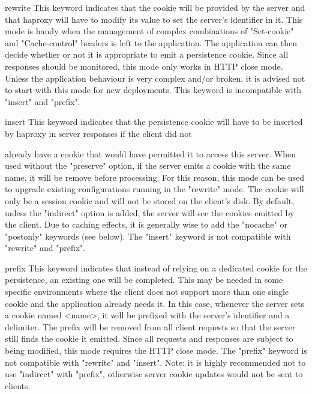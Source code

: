     rewrite   This keyword indicates that the cookie will be provided by the
              server and that haproxy will have to modify its value to set the
              server's identifier in it. This mode is handy when the management
              of complex combinations of "Set-cookie" and "Cache-control"
              headers is left to the application. The application can then
              decide whether or not it is appropriate to emit a persistence
              cookie. Since all responses should be monitored, this mode only
              works in HTTP close mode. Unless the application behaviour is
              very complex and/or broken, it is advised not to start with this
              mode for new deployments. This keyword is incompatible with
              "insert" and "prefix".

    insert    This keyword indicates that the persistence cookie will have to
              be inserted by haproxy in server responses if the client did not

              already have a cookie that would have permitted it to access this
              server. When used without the "preserve" option, if the server
              emits a cookie with the same name, it will be remove before
              processing.  For this reason, this mode can be used to upgrade
              existing configurations running in the "rewrite" mode. The cookie
              will only be a session cookie and will not be stored on the
              client's disk. By default, unless the "indirect" option is added,
              the server will see the cookies emitted by the client. Due to
              caching effects, it is generally wise to add the "nocache" or
              "postonly" keywords (see below). The "insert" keyword is not
              compatible with "rewrite" and "prefix".

    prefix    This keyword indicates that instead of relying on a dedicated
              cookie for the persistence, an existing one will be completed.
              This may be needed in some specific environments where the client
              does not support more than one single cookie and the application
              already needs it. In this case, whenever the server sets a cookie
              named <name>, it will be prefixed with the server's identifier
              and a delimiter. The prefix will be removed from all client
              requests so that the server still finds the cookie it emitted.
              Since all requests and responses are subject to being modified,
              this mode requires the HTTP close mode. The "prefix" keyword is
              not compatible with "rewrite" and "insert". Note: it is highly
              recommended not to use "indirect" with "prefix", otherwise server
              cookie updates would not be sent to clients.

